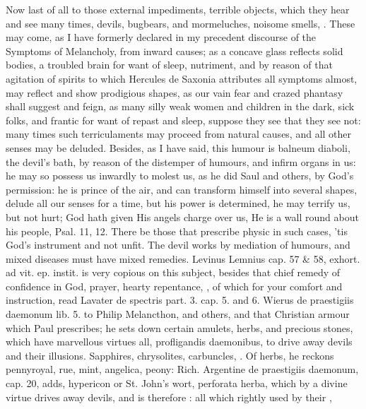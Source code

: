 {Now last of all to those external impediments, terrible objects, which
they hear and see many times, devils, bugbears, and mormeluches,
noisome smells, \etc{}. These may come, as I have formerly declared in my
precedent discourse of the Symptoms of Melancholy, from inward causes;
as a concave glass reflects solid bodies, a troubled brain for want of
sleep, nutriment, and by reason of that agitation of spirits to which
Hercules de Saxonia attributes all symptoms almost, may reflect and
show prodigious shapes, as our vain fear and crazed phantasy shall
suggest and feign, as many silly weak women and children in the dark,
sick folks, and frantic for want of repast and sleep, suppose they see
that they see not: many times such terriculaments may proceed from
natural causes, and all other senses may be deluded. Besides, as I have
said, this humour is balneum diaboli, the devil's bath, by reason of
the distemper of humours, and infirm organs in us: he may so possess us
inwardly to molest us, as he did Saul and others, by God's permission:
he is prince of the air, and can transform himself into several shapes,
delude all our senses for a time, but his power is determined, he may
terrify us, but not hurt; God hath given His angels charge over us, He
is a wall round about his people, Psal.  11, 12. There be those
that prescribe physic in such cases, 'tis God's instrument and not
unfit. The devil works by mediation of humours, and mixed diseases must
have mixed remedies. Levinus Lemnius cap. 57 \& 58, exhort. \textlatin{ad vit. ep.
instit.} is very copious on this subject, besides that chief remedy of
confidence in God, prayer, hearty repentance, \etc{}, of which for your
comfort and instruction, read Lavater \textlatin{de spectris part. 3. cap. 5. and
6. Wierus de praestigiis daemonum lib. 5.} to Philip Melancthon, and
others, and that Christian armour which Paul prescribes; he sets down
certain amulets, herbs, and precious stones, which have marvellous
virtues all, profligandis daemonibus, to drive away devils and their
illusions. Sapphires, chrysolites, carbuncles, \etc{}.  Of herbs, he reckons  pennyroyal,
rue, mint, angelica, peony: Rich. Argentine de praestigiis daemonum,
cap. 20, adds, hypericon or St. John's wort, perforata herba, which by
a divine virtue drives away devils, and is therefore : all
which rightly used by their , }
